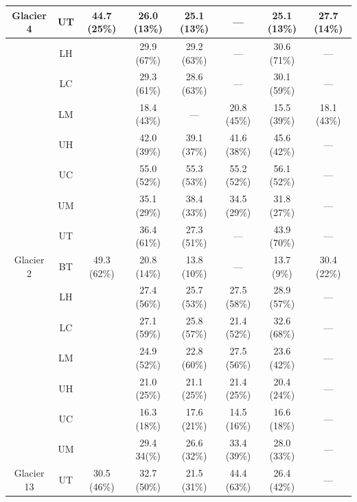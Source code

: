 \documentclass{sfuthesis}
\begin{document}
\begin{appendices}
\begin{table}[]
\begin{tabular}{cccccccc}
\multirow{-7}{*}{ Glacier 4} & UT & \multirow{-7}{*}{ 44.7  (25\%)} & 26.0   (13\%)& 25.1  (13\%) & --- & 25.1  (13\%) & 27.7  (14\%) \\ \hline
 & LH &  & 29.9  (67\%) & 29.2  (63\%) & --- & 30.6  (71\%) & --- \\
 & LC &  & 29.3  (61\%) & 28.6  (63\%) & --- & 30.1  (59\%) & --- \\
 & LM &  & 18.4  (43\%) & --- & 20.8   (45\%)& 15.5  (39\%) & 18.1  (43\%) \\
 & UH &  & 42.0  (39\%) & 39.1  (37\%) & 41.6  (38\%) & 45.6  (42\%) & --- \\
 & UC &  & 55.0   (52\%)& 55.3  (53\%) & 55.2  (52\%) & 56.1  (52\%) & --- \\
 & UM &  & 35.1  (29\%) & 38.4  (33\%) & 34.5  (29\%) & 31.8  (27\%) & --- \\
 & UT &  & 36.4  (61\%) & 27.3 (51\%) & --- & 43.9  (70\%) & --- \\
\multirow{-8}{*}{Glacier 2} & BT & \multirow{-8}{*}{49.3 (62\%)} & 20.8 (14\%)& 13.8 (10\%)& --- & 13.7 (9\%) & 30.4 (22\%) \\ \hline
  
  & LH &   & 27.4  (56\%) & 25.7 (53\%) & 27.5 (58\%) & 28.9 (57\%) & --- \\
  
  & LC &   & 27.1  (59\%) & 25.8 (57\%) & 21.4 (52\%) & 32.6 (68\%) & --- \\
  
  & LM &   & 24.9  (52\%) & 22.8 (60\%) & 27.5 (56\%) & 23.6 (42\%) & --- \\
  
  & UH &   & 21.0  (25\%) & 21.1 (25\%) & 21.4 (25\%) & 20.4 (24\%) & --- \\
  
  & UC &   & 16.3  (18\%) & 17.6 (21\%) & 14.5 (16\%) & 16.6 (18\%) & --- \\
  
  & UM &   & 29.4  34(\%) & 26.6 (32\%) & 33.4 (39\%) & 28.0 (33\%) & --- \\
  
\multirow{-7}{*}{ Glacier 13} & UT & \multirow{-7}{*}{ 30.5 (46\%)} & 32.7 (50\%) & 21.5 (31\%) & 44.4 (63\%) & 26.4 (42\%) & ---
\end{tabular}
\end{table}



\end{appendices}
\end{document}
